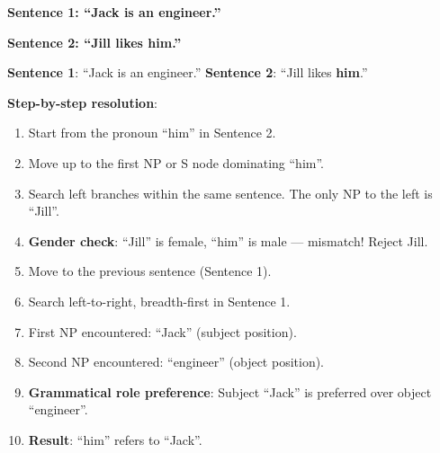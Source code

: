 \documentclass[11pt,a4paper]{article}
\begin{document}
\begin{center}
\begin{minipage}{0.45\textwidth}
\centering
\textbf{Sentence 1: ``Jack is an engineer.''}
\end{minipage}
\hfill
\begin{minipage}{0.45\textwidth}
\centering
\textbf{Sentence 2: ``Jill likes him.''}
\end{minipage}
\end{center}

\begin{tcolorbox}[colback=green!5!white,colframe=green!75!black,title=\textbf{Worked Example: Hobbs Algorithm Application}]
\textbf{Sentence 1}: ``Jack is an engineer.''
\textbf{Sentence 2}: ``Jill likes \textbf{him}.''

\textbf{Step-by-step resolution}:
\begin{enumerate}
    \item Start from the pronoun ``him'' in Sentence 2.
    \item Move up to the first NP or S node dominating ``him''.
    \item Search left branches within the same sentence. The only NP to the left is ``Jill''.
    \item \textbf{Gender check}: ``Jill'' is female, ``him'' is male --- mismatch! Reject Jill.
    \item Move to the previous sentence (Sentence 1).
    \item Search left-to-right, breadth-first in Sentence 1.
    \item First NP encountered: ``Jack'' (subject position).
    \item Second NP encountered: ``engineer'' (object position).
    \item \textbf{Grammatical role preference}: Subject ``Jack'' is preferred over object ``engineer''.
    \item \textbf{Result}: ``him'' refers to ``Jack''.
\end{enumerate}
\end{tcolorbox}
\end{document}
